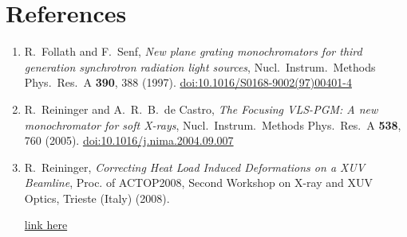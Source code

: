 \documentclass[12pt,a4paper]{article}
\begin{document}
\bigskip
\section*{References}

\begin{enumerate}
  \item R.\ Follath and F.\ Senf,
        \textit{New plane grating monochromators for third generation synchrotron
        radiation light sources},
        Nucl.\ Instrum.\ Methods Phys.\ Res.\ A \textbf{390}, 388 (1997).
        \href{https://doi.org/10.1016/S0168-9002(97)00401-4}{doi:10.1016/S0168-9002(97)00401-4}

  \item R.\ Reininger and A.\ R.\ B.\ de Castro,
        \textit{The Focusing VLS-PGM: A new monochromator for soft X-rays},
        Nucl.\ Instrum.\ Methods Phys.\ Res.\ A \textbf{538}, 760 (2005).
        \href{https://doi.org/10.1016/j.nima.2004.09.007}{doi:10.1016/j.nima.2004.09.007}

  \item R.\ Reininger,
        \textit{Correcting Heat Load Induced Deformations on a XUV Beamline},
        Proc. of ACTOP2008, Second Workshop on X-ray and XUV Optics, Trieste (Italy) (2008).

\href{https://www.elettra.eu/actop08/uploads/Main/a29.pdf}{link here}
\end{enumerate}
\end{document}
